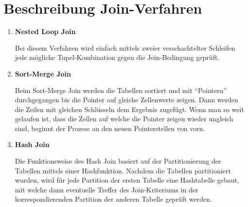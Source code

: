 \documentclass{scrartcl}
\begin{document}
\section{Beschreibung Join-Verfahren}
\begin{enumerate}
    \item \textbf{Nested Loop Join}
    
    Bei diesem Verfahren wird einfach mittels zweier verschachtelter Schleifen jede mögliche Tupel-Kombination gegen die Join-Bedingung geprüft.
    \item \textbf{Sort-Merge Join}
    
    Beim Sort-Merge Join werden die Tabellen sortiert und mit ``Pointern'' durchgegangen bis die Pointer auf gleiche Zellenwerte zeigen. Dann werden die Zeilen mit gleichen Schlüsseln dem Ergebnis zugefügt. Wenn man so weit gelaufen ist, dass die Zellen auf welche die Pointer zeigen wieder ungleich sind, beginnt der Prozess an den neuen Pointerstellen von vorn.
    \item \textbf{Hash Join}
    
    Die Funktionsweise des Hash Join basiert auf der Partitionierung der Tabellen mittels einer Hashfunktion. Nachdem die Tabellen partitioniert wurden, wird für jede Partition der ersten Tabelle eine Hashtabelle gebaut, mit welche dann eventuelle Treffer des Join-Kriteriums in der korrespondierenden Partition der anderen Tabelle geprüft werden.
\end{enumerate}
\end{document}
